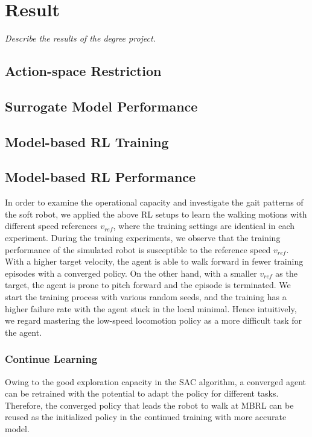 \chapter{Result}
\label{chap5}
\textit{Describe the results of the degree project.}

\section{Action-space Restriction}



\section{Surrogate Model Performance}


\section{Model-based RL Training}

\section{Model-based RL Performance}

In order to examine the operational capacity and investigate the gait patterns of the soft robot, we applied the above RL setups to learn the walking motions with different speed references $v_{ref}$, where the training settings are identical in each experiment. During the training experiments, we observe that the training performance of the simulated robot is susceptible to the reference speed $v_{ref}$. With a higher target velocity, the agent is able to walk forward in fewer training episodes with a converged policy. On the other hand, with a smaller $v_{ref}$ as the target, the agent is prone to pitch forward and the episode is terminated. We start the training process with various random seeds, and the training has a higher failure rate with the agent stuck in the local minimal. Hence intuitively, we regard mastering the low-speed locomotion policy as a more difficult task for the agent.


\subsection{Continue Learning}
Owing to the good exploration capacity in the SAC algorithm, a converged agent can be retrained with the potential to adapt the policy for different tasks. Therefore, the converged policy that leads the robot to walk at MBRL can be reused as the initialized policy in the continued training with more accurate model.

